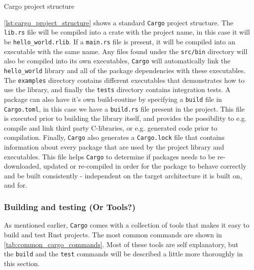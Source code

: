 \begin{listing}
\caption{Cargo project structure}
\label{lst:cargo_project_structure}
\end{listing}

\autoref{lst:cargo_project_structure} shows a standard \texttt{Cargo} project structure.
The \texttt{lib.rs} file will be compiled into a crate with the project name, in this case it will be \texttt{hello\_world.rlib}.
If a \texttt{main.rs} file is present, it will be compiled into an executable with the same name.
Any files found under the \texttt{src/bin} directory will also be compiled into its own executables, \texttt{Cargo} will automatically link the \texttt{hello\_world} library and all of the package dependencies with these executables.
The \texttt{examples} directory contains different executables that demonstrates how to use the library, and finally the \texttt{tests} directory contains integration tests.
A package can also have it's own build-routine by specifying a \texttt{build} file in \texttt{Cargo.toml}, in this case we have a \texttt{build.rs} file present in the project.
This file is executed prior to building the library itself, and provides the possibility to e.g. compile and link third party C-libraries, or e.g. generated code prior to compilation.
Finally, \texttt{Cargo} also generates a \texttt{Cargo.lock} file that contains information about every package that are used by the project library and executables.
This file helps \texttt{Cargo} to determine if packages needs to be re-downloaded, updated or re-compiled in order for the package to behave correctly and be built consistently - independent on the target architecture it is built on, and for.

\subsubsection{Building and testing (Or Tools?)}

As mentioned earlier, \texttt{Cargo} comes with a collection of tools that makes it easy to build and test Rust projects.
The most common commands are shown in \autoref{tab:common_cargo_commands}.
Most of these tools are self explanatory, but the \texttt{build} and the \texttt{test} commands will be described a little more thoroughly in this section.

